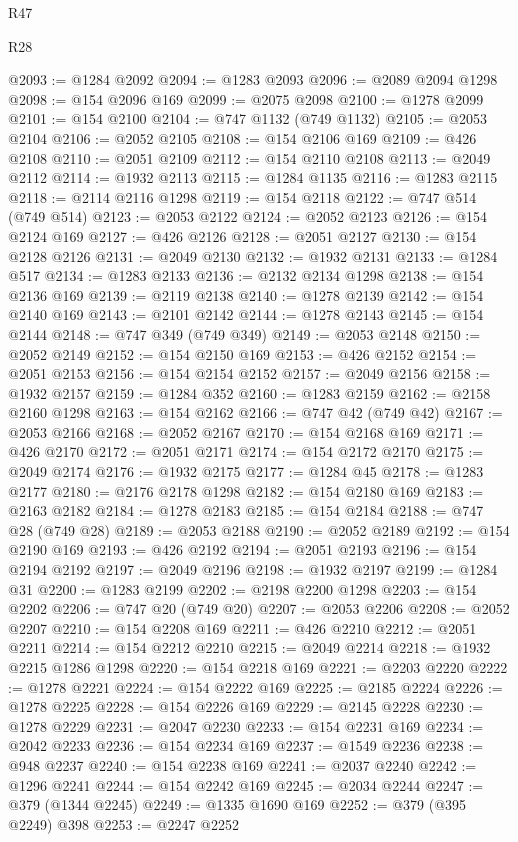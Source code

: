 \begin{lexlean}{R47}
\begin{lexlean}{R28}
\begin{coremodule}
{{{{{{{{{{{{{{{{{{{{{{{{{{{{{{{{{{{{{{{{{{{{{{{{{{{{{{{{{{{{{{{{{{{{{{{{{{{{{{{{{{{{{{{{{{{{{{{{{{{{{{{{{{{{{{{{{{{{{{{{{{{{{{{{{{{{{@2093 := @1284 @2092
@2094 := @1283 @2093
@2096 := @2089 @2094 @1298
@2098 := @154 @2096 @169
@2099 := @2075 @2098
@2100 := @1278 @2099
@2101 := @154 @2100
@2104 := @747 @1132 (@749 @1132)
@2105 := @2053 @2104
@2106 := @2052 @2105
@2108 := @154 @2106 @169
@2109 := @426 @2108
@2110 := @2051 @2109
@2112 := @154 @2110 @2108
@2113 := @2049 @2112
@2114 := @1932 @2113
@2115 := @1284 @1135
@2116 := @1283 @2115
@2118 := @2114 @2116 @1298
@2119 := @154 @2118
@2122 := @747 @514 (@749 @514)
@2123 := @2053 @2122
@2124 := @2052 @2123
@2126 := @154 @2124 @169
@2127 := @426 @2126
@2128 := @2051 @2127
@2130 := @154 @2128 @2126
@2131 := @2049 @2130
@2132 := @1932 @2131
@2133 := @1284 @517
@2134 := @1283 @2133
@2136 := @2132 @2134 @1298
@2138 := @154 @2136 @169
@2139 := @2119 @2138
@2140 := @1278 @2139
@2142 := @154 @2140 @169
@2143 := @2101 @2142
@2144 := @1278 @2143
@2145 := @154 @2144
@2148 := @747 @349 (@749 @349)
@2149 := @2053 @2148
@2150 := @2052 @2149
@2152 := @154 @2150 @169
@2153 := @426 @2152
@2154 := @2051 @2153
@2156 := @154 @2154 @2152
@2157 := @2049 @2156
@2158 := @1932 @2157
@2159 := @1284 @352
@2160 := @1283 @2159
@2162 := @2158 @2160 @1298
@2163 := @154 @2162
@2166 := @747 @42 (@749 @42)
@2167 := @2053 @2166
@2168 := @2052 @2167
@2170 := @154 @2168 @169
@2171 := @426 @2170
@2172 := @2051 @2171
@2174 := @154 @2172 @2170
@2175 := @2049 @2174
@2176 := @1932 @2175
@2177 := @1284 @45
@2178 := @1283 @2177
@2180 := @2176 @2178 @1298
@2182 := @154 @2180 @169
@2183 := @2163 @2182
@2184 := @1278 @2183
@2185 := @154 @2184
@2188 := @747 @28 (@749 @28)
@2189 := @2053 @2188
@2190 := @2052 @2189
@2192 := @154 @2190 @169
@2193 := @426 @2192
@2194 := @2051 @2193
@2196 := @154 @2194 @2192
@2197 := @2049 @2196
@2198 := @1932 @2197
@2199 := @1284 @31
@2200 := @1283 @2199
@2202 := @2198 @2200 @1298
@2203 := @154 @2202
@2206 := @747 @20 (@749 @20)
@2207 := @2053 @2206
@2208 := @2052 @2207
@2210 := @154 @2208 @169
@2211 := @426 @2210
@2212 := @2051 @2211
@2214 := @154 @2212 @2210
@2215 := @2049 @2214
@2218 := @1932 @2215 @1286 @1298
@2220 := @154 @2218 @169
@2221 := @2203 @2220
@2222 := @1278 @2221
@2224 := @154 @2222 @169
@2225 := @2185 @2224
@2226 := @1278 @2225
@2228 := @154 @2226 @169
@2229 := @2145 @2228
@2230 := @1278 @2229
@2231 := @2047 @2230
@2233 := @154 @2231 @169
@2234 := @2042 @2233
@2236 := @154 @2234 @169
@2237 := @1549 @2236
@2238 := @948 @2237
@2240 := @154 @2238 @169
@2241 := @2037 @2240
@2242 := @1296 @2241
@2244 := @154 @2242 @169
@2245 := @2034 @2244
@2247 := @379 (@1344 @2245)
@2249 := @1335 @1690 @169
@2252 := @379 (@395 @2249) @398
@2253 := @2247 @2252
}}}}}}}}}}}}}}}}}}}}}}}}}}}}}}}}}}}}}}}}}}}}}}}}}}}}}}}}}}}}}}}}}}}}}}}}}}}}}}}}}}}}}}}}}}}}}}}}}}}}}}}}}}}}}}}}}}}}}}}}}}}}}}}}}}}}}
\end{coremodule}
\end{lexlean}
\end{lexlean}
